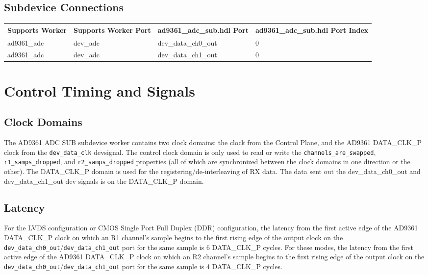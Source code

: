 \documentclass{article}
\def\comp{ad9361\_adc\_sub}
\def\Comp{AD9361 ADC SUB}
\begin{document}
\begin{landscape}
	\section*{Subdevice Connections}
	\begin{scriptsize}
		\begin{tabular}{|p{5cm}|p{5cm}|p{5cm}|p{7.23cm}|}
			\hline
			\rowcolor{blue}
			Supports Worker & Supports Worker Port & \comp{}.hdl Port     & \comp{}.hdl Port Index \\
			\hline
			ad9361\_adc     & dev\_adc             & dev\_data\_ch0\_out & 0 \\
			\hline
			ad9361\_adc     & dev\_adc             & dev\_data\_ch1\_out & 0 \\
			\hline
		\end{tabular}
	\end{scriptsize}

\end{landscape}

\section*{Control Timing and Signals}
\subsection*{Clock Domains}
The \Comp{} subdevice worker contains two clock domains: the clock from the Control Plane, and the AD9361 DATA\_CLK\_P clock from the \verb+dev_data_clk+ devsignal. The control clock domain is only used to read or write the \verb+channels_are_swapped+, \verb+r1_samps_dropped+, and \verb+r2_samps_dropped+ properties (all of which are synchronized between the clock domains in one direction or the other). The DATA\_CLK\_P domain is used for the registering/de-interleaving of RX data. The data sent out the dev\_data\_ch0\_out and dev\_data\_ch1\_out dev signals is on the DATA\_CLK\_P domain.
\subsection*{Latency}
\noindent For the LVDS configuration or CMOS Single Port Full Duplex (DDR) configuration, the latency from the first active edge of the AD9361 DATA\_CLK\_P clock on which an R1 channel's sample begins to the first rising edge of the output clock on the \verb+dev_data_ch0_out+/\verb+dev_data_ch1_out+ port for the same sample is 6 DATA\_CLK\_P cycles. For these modes, the latency from the first active edge of the AD9361 DATA\_CLK\_P clock on which an R2 channel's sample begins to the first rising edge of the output clock on the \verb+dev_data_ch0_out+/\verb+dev_data_ch1_out+ port for the same sample is 4 DATA\_CLK\_P cycles.
\end{document}
